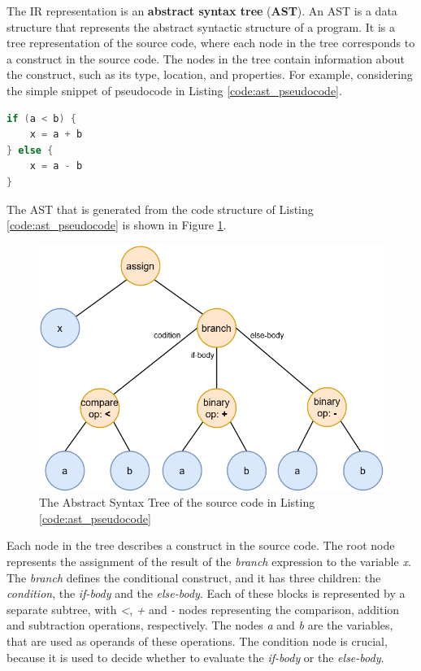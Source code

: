 The IR representation is an \textbf{abstract syntax tree} (\textbf{AST}). An AST \cite{ast_explanation} is a data structure that represents the abstract syntactic structure of a program. It is a tree representation of the source code, where each node in the tree corresponds to a construct in the source code. The nodes in the tree contain information about the construct, such as its type, location, and properties.\newline
For example, considering the simple snippet of pseudocode in Listing \ref{code:ast_pseudocode}.
\begin{lstlisting}[caption={Pseudocode of a simple assignment and expression}, language=Kotlin, captionpos=b, label={code:ast_pseudocode}]
if (a < b) {
    x = a + b
} else {
    x = a - b
}
\end{lstlisting}
The AST that is generated from the code structure of Listing \ref{code:ast_pseudocode} is shown in Figure \ref{fig:ast_pseudocode_example}.
\begin{figure}[!ht]
    \centering
    \includegraphics[scale=0.5]{document/chapters/2-metaprogramming/images/ast_pseudocode_example.png}
    \caption{The Abstract Syntax Tree of the source code in Listing \ref{code:ast_pseudocode}}
    \label{fig:ast_pseudocode_example}
\end{figure}
Each node in the tree describes a construct in the source code. The root node represents the assignment of the result of the \textit{branch} expression to the variable \textit{x}. The \textit{branch} defines the conditional construct, and it has three children: the \textit{condition}, the \textit{if-body} and the \textit{else-body}. Each of these blocks is represented by a separate subtree, with \textit{<}, \textit{+} and \textit{-} nodes representing the comparison, addition and subtraction operations, respectively. The nodes \textit{a} and \textit{b} are the variables, that are used as operands of these operations.\newline
The condition node is crucial, because it is used to decide whether to evaluate the \textit{if-body} or the \textit{else-body}.

